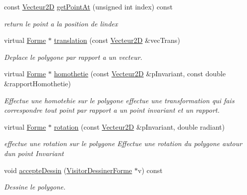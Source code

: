 \begin{DoxyCompactItemize}
const \mbox{\hyperlink{class_vecteur2_d}{Vecteur2D}} \mbox{\hyperlink{class_polygone_a42ae9f828760d86f55c451f962c3d971}{get\+Point\+At}} (unsigned int index) const
\begin{DoxyCompactList}\small\item\em return le point a la position de l\textquotesingle{}index \end{DoxyCompactList}\item 
virtual \mbox{\hyperlink{class_forme}{Forme}} $\ast$ \mbox{\hyperlink{class_polygone_a3fa7127577c992041b80cb5dd7e56671}{translation}} (const \mbox{\hyperlink{class_vecteur2_d}{Vecteur2D}} \&vec\+Trans)
\begin{DoxyCompactList}\small\item\em Deplace le polygone par rapport a un vecteur. \end{DoxyCompactList}\item 
virtual \mbox{\hyperlink{class_forme}{Forme}} $\ast$ \mbox{\hyperlink{class_polygone_a2b3a44918d723d9fc8bf053b7d8410cb}{homothetie}} (const \mbox{\hyperlink{class_vecteur2_d}{Vecteur2D}} \&p\+Invariant, const double \&rapport\+Homothetie)
\begin{DoxyCompactList}\small\item\em Effectue une homotehie sur le polygone effectue une transformation qui fais correspondre tout point par rapport a un point invariant et un rapport. \end{DoxyCompactList}\item 
virtual \mbox{\hyperlink{class_forme}{Forme}} $\ast$ \mbox{\hyperlink{class_polygone_a8d2a29722b3e3256fac28bc3e0af1136}{rotation}} (const \mbox{\hyperlink{class_vecteur2_d}{Vecteur2D}} \&p\+Invariant, double radiant)
\begin{DoxyCompactList}\small\item\em effectue une rotation sur le polygone Effectue une rotation du polygone autour d\textquotesingle{}un point Invariant \end{DoxyCompactList}\item 
void \mbox{\hyperlink{class_polygone_ae39b5264345f7d2f64112a9680155844}{accepte\+Dessin}} (\mbox{\hyperlink{class_visitor_dessiner_forme}{Visitor\+Dessiner\+Forme}} $\ast$v) const
\begin{DoxyCompactList}\small\item\em Dessine le polygone. \end{DoxyCompactList}\item 
\mbox{\label{class_polygone_a3ded5fc50f6db8d734b4272c604d6d8c}} 

\end{DoxyCompactItemize}
